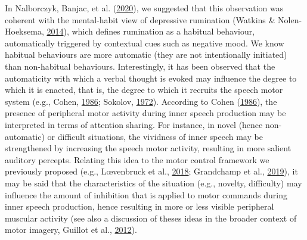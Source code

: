 \documentclass[
  english,
  man, donotrepeattitle,floatsintext]{apa6}
\begin{document}
In Nalborczyk, Banjac, et al. (\protect\hyperlink{ref-nalborczyk_dissociating_2020}{2020}), we suggested that this observation was coherent with the mental-habit view of depressive rumination (Watkins \& Nolen-Hoeksema, \protect\hyperlink{ref-watkins_habit-goal_2014}{2014}), which defines rumination as a habitual behaviour, automatically triggered by contextual cues such as negative mood. We know habitual behaviours are more automatic (they are not intentionally initiated) than non-habitual behaviours. Interestingly, it has been observed that the automaticity with which a verbal thought is evoked may influence the degree to which it is enacted, that is, the degree to which it recruits the speech motor system (e.g., Cohen, \protect\hyperlink{ref-cohen_motor_1986}{1986}; Sokolov, \protect\hyperlink{ref-sokolov_inner_1972}{1972}). According to Cohen (\protect\hyperlink{ref-cohen_motor_1986}{1986}), the presence of peripheral motor activity during inner speech production may be interpreted in terms of attention sharing. For instance, in novel (hence non-automatic) or difficult situations, the vividness of inner speech may be strengthened by increasing the speech motor activity, resulting in more salient auditory percepts. Relating this idea to the motor control framework we previously proposed (e.g., Lœvenbruck et al., \protect\hyperlink{ref-loevenbruck_cognitive_2018}{2018}; Grandchamp et al., \protect\hyperlink{ref-grandchamp_condialint_2019}{2019}), it may be said that the characteristics of the situation (e.g., novelty, difficulty) may influence the amount of inhibition that is applied to motor commands during inner speech production, hence resulting in more or less visible peripheral muscular activity (see also a discussion of theses ideas in the broader context of motor imagery, Guillot et al., \protect\hyperlink{ref-guillot_imagining_2012}{2012}).
\end{document}
